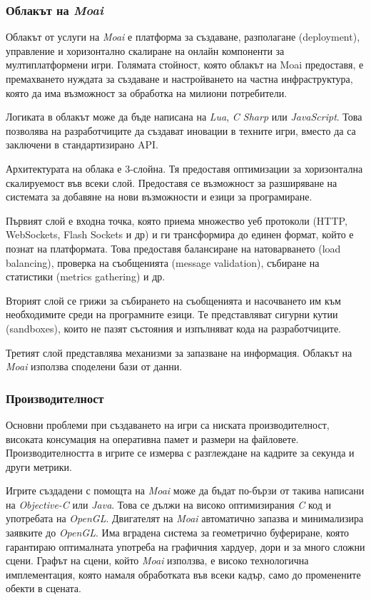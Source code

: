 		\subsubsection{Облакът на \emph{Moai}}
		
			Облакът от услуги на \emph{Moai} е платформа за създаване, разполагане (deployment), управление и 
			хоризонтално скалиране на онлайн компоненти за мултиплатформени игри. Голямата стойност, която облакът
			на Moai предоставя, е премахването нуждата за създаване и настройването на частна инфраструктура, която
			да има възможност за обработка на милиони потребители.
			
			Логиката в облакът може да бъде написана на \emph{Lua}, \emph{C Sharp} или \emph{JavaScript}.
			Това позволява на разработчиците да създават иновации в техните игри, вместо да са заключени
			в стандартизирано \ac{API}.
			
			Архитектурата на облака е 3-слойна. Тя предоставя оптимизации за хоризонтална скалируемост във
			всеки слой. Предоставя се възможност за разширяване на системата за добавяне на нови възможности
			и езици за програмиране.
			
			Първият слой е входна точка, която приема множество уеб протоколи (HTTP, WebSockets, Flash Sockets и др) и ги 
			трансформира до единен формат, който е познат на платформата. Това предоставя балансиране на натоварването (load balancing),
			проверка на съобщенията (message validation), събиране на статистики (metrics gathering) и др.
			
			Вторият слой се грижи за събирането на съобщенията и насочването им към необходимите среди на програмните езици.
			Те представляват сигурни кутии (sandboxes), които не пазят състояния и изпълняват кода на разработчиците.
			
			Третият слой представлява механизми за запазване на информация. Облакът на \emph{Moai} използва споделени
			бази от данни.
			
		\subsubsection{Производителност}
		
			Основни проблеми при създаването на игри са ниската производителност, високата консумация на оперативна памет
			и размери на файловете. Производителността в игрите се измерва с разглеждане на кадрите за секунда и други метрики.
			
			Игрите създадени с помощта на \emph{Moai} може да бъдат по-бързи от такива написани на \emph{Objective-C} или \emph{Java}.
			Това се дължи на високо оптимизирания \emph{C} код и употребата на \emph{OpenGL}. Двигателят на \emph{Moai} автоматично
			запазва и минимализира заявките до \emph{OpenGL}. Има вградена система за геометрично буфериране, която гарантираю
			оптималната употреба на графичния хардуер, дори и за много сложни сцени. Графът на сцени, който \emph{Moai} използва,
			е високо технологична имплементация, която намаля обработката във всеки кадър, само до променените обекти в сцената.
			
